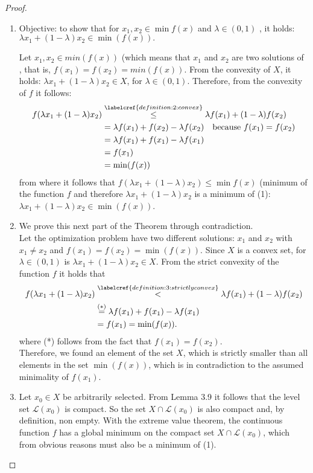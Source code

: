 \begin{proof}
	\begin{enumerate}[label=(\arabic*)]
		\item Objective: to show that for $x_1, x_2 \in \min f(x)$ and $\lambda \in (0,1)$ , it holds: $\lambda x_1+(1-\lambda)x_2 \in \min(f(x)).$ 
		
		Let $x_1, x_2 \in min(f(x))$  (which means that $x_1$ and $x_2$ are two solutions of , that is, $f(x_1)=f(x_2)=min(f(x))$. From the convexity of $X$, it holds: $\lambda x_1 +(1-\lambda) x_2 \in X$, for $\lambda\in (0,1)$. Therefore, from the convexity of $f$ it follows: 
		\begin{align*}
		f(\lambda x_1+(1-\lambda)x_2) &\overset{\labelcref{definition:2:convex}}{\leq}\lambda f(x_1)+(1-\lambda)f(x_2)\\
		&= \lambda f(x_1)+f(x_2)-\lambda f(x_2)  \quad \text{because } f(x_1)=f(x_2)\\
		&= \lambda f(x_1)+f(x_1)-\lambda f(x_1)\\
		&= f(x_1)\\
		&= \min(f(x))
		\end{align*}
		from where it follows that $f(\lambda{x_1}+(1-\lambda)x_2)\leq \min f(x)$ (minimum of the function $f$ and therefore $\lambda x_1 + (1-\lambda)x_2$ is a minimum of (1): $\lambda x_1 + (1-\lambda)x_2\in \min(f(x))$.
		
		\item We prove this next part of the Theorem through contradiction. \\ 
		Let the optimization problem  have two different solutions: $x_1$ and $x_2$ with $x_1 \neq x_2$ and $f(x_1)=f(x_2)=\min(f(x))$. Since $X$ is a convex set, for $\lambda\in (0,1)$ is $\lambda x_1 + (1-\lambda) x_2 \in X$. From the strict convexity of the function $f$ it holds that 
		\begin{align*}
		f( \lambda x_1 + (1-\lambda) x_2 ) &\overset{\labelcref{definition:3:strictlyconvex}}{<} \lambda f(x_1) + (1-\lambda) f(x_2)\\
		&\overset{(*)}{=}\lambda f(x_1) + f(x_1) - \lambda f(x_1)\\
		&= f(x_1) = \min(f(x)).
		\end{align*}
		where (*) follows from the fact that $f(x_1)=f(x_2)$. \\
		Therefore, we found an element of the set $X$, which is strictly smaller than all elements in the set $\min(f(x))$, which is in contradiction to the assumed minimality of $f(x_1)$.
		\item Let $x_0\in X$ be arbitrarily selected. From Lemma 3.9 it follows that the level set $\mathcal{L}(x_0)$ is compact. So the set $X \cap \mathcal{L}(x_0)$ is also compact and, by definition, non empty. With the extreme value theorem, the continuous function $f$ has a global minimum on the compact set $X \cap \mathcal{L}(x_0)$, which from obvious reasons must also be a minimum of (1). 
		

\end{enumerate}
\end{proof}
